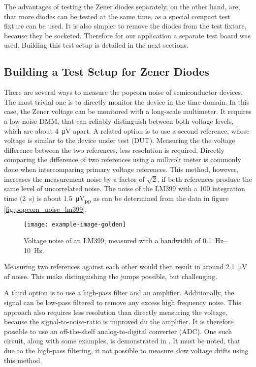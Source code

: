 The advantages of testing the Zener diodes separately, on the other hand, are, that more diodes can be tested at the same time, as a special compact test fixture can be used. It is also simpler to remove the diodes from the test fixture, because they be socketed. Therefore for our application a separate test board was used. Building this test setup is detailed in the next sections.

\subsection{Building a Test Setup for Zener Diodes}
There are several ways to measure the popcorn noise of semiconductor devices. The most trivial one is to directly monitor the device in the time-domain. In this case, the Zener voltage can be monitored with a long-scale multimeter. It requires a low noise DMM, that can reliably distinguish between both voltage levels, which are about \qty{4}{\micro \volt} apart.
A related option is to use a second reference, whose voltage is similar to the device under test (DUT). Measuring the the voltage difference between the two references, less resolution is required. Directly comparing the difference of two references using a millivolt meter is commonly done when intercomparing primary voltage references. This method, however, increases the measurement noise by a factor of $\sqrt{2}$, if both references produce the same level of uncorrelated noise. The noise of the LM399 with a \qty{100}{\plc} integration time (\qty{2}{\second}) is about \qty{1.5}{\micro \volt_{pp}} as can be determined from the data in figure \ref{fig:popcorn_noise_lm399}.

\begin{figure}[ht]
    \centering
    \texttt{[image: example-image-golden]}
    \caption{Voltage noise of an LM399, measured with a bandwidth of \qtyrange{0.1}{10}{\Hz}.}
    \label{fig:noise_lm399}
\end{figure}

Measuring two references against each other would then result in around \qty{2.1}{\micro \volt} of noise. This make distinguishing the jumps possible, but challenging.

A third option is to use a high-pass filter and an amplifier. Additionally, the signal can be low-pass filtered to remove any excess high frequency noise. This approach also requires less resolution than directly measuring the voltage, because the signal-to-noise-ratio is improved du the amplifier. It is therefore possible to use an off-the-shelf analog-to-digital converter (ADC). One such circuit, along with some examples, is demonstrated in \cite{technote_ti_popcorn_noise,kay2012operational}. It must be noted, that due to the high-pass filtering, it not possible to measure slow voltage drifts using this method.

